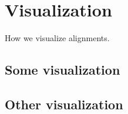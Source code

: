 \chapter{Visualization}

\label{kap:visualization} %

How we visualize alignments.

\section{Some visualization}

\section{Other visualization}